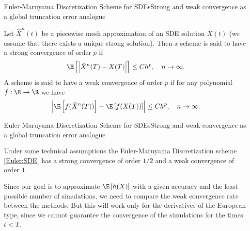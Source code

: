 \documentclass[aspectratio=169]{beamer}
\begin{document}
        \begin{frame}{Euler-Maruyama Discretization Scheme for SDEs}{Strong and weak convergence as a global truncation error analogue}
            \begin{definition}
                Let $\hat X^n(t)$ be a piecewise mesh approximation of an SDE solution $X(t)$ (we assume that there exists a unique strong solution). 
                Then a scheme is said to have a strong convergence of order $p$ if 
                \begin{equation}
                    \E\left[\left|\hat X^n(T) - X(T)\right|\right] \leq Ch^p, \quad n \to \infty.
                \end{equation}
                A scheme is said to have a weak convergence of order $p$ if for any polynomial $f: \R \to \R$ we have
                \begin{equation}
                    \left|\E\left[f(\hat X^n(T))\right] - \E\left[f(X(T))\right]\right| \leq Ch^p, \quad n \to \infty.
                \end{equation}
            \end{definition}
        \end{frame}

        \begin{frame}{Euler-Maruyama Discretization Scheme for SDEs}{Strong and weak convergence as a global truncation error analogue}
            \begin{theorem}
                Under some technical assumptions the Euler-Maruyama Discretization scheme \eqref{Euler:SDE} has a strong convergence of order $1/2$ and a weak convergence of order $1$.
            \end{theorem}
        
            \begin{nb}
                Since our goal is to approximate $\E\left[h(X)\right]$ with a given accuracy and the least possible number of simulations, we need to compare the weak convergence rate between the methods.
                But this will work only for the derivatives of the European type, since we cannot guarantee the convergence of the simulations for the times $t < T$.
            \end{nb}
        \end{frame}
\end{document}
